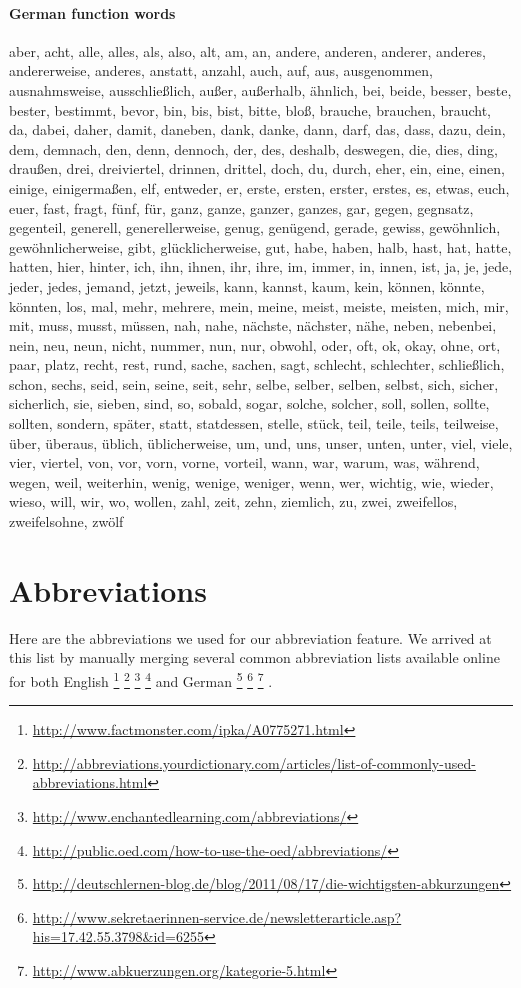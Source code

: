 \paragraph{German function words}
aber, acht, alle, alles, als, also, alt, am, an, andere, anderen, anderer, anderes, andererweise, anderes, anstatt, anzahl, auch, auf, aus, ausgenommen, ausnahmsweise, ausschließlich, außer, außerhalb, ähnlich, bei, beide, besser, beste, bester, bestimmt, bevor, bin, bis, bist, bitte, bloß, brauche, brauchen, braucht, da, dabei, daher, damit, daneben, dank, danke, dann, darf, das, dass, dazu, dein, dem, demnach, den, denn, dennoch, der, des, deshalb, deswegen, die, dies, ding, draußen, drei, dreiviertel, drinnen, drittel, doch, du, durch, eher, ein, eine, einen, einige, einigermaßen, elf, entweder, er, erste, ersten, erster, erstes, es, etwas, euch, euer, fast, fragt, fünf, für, ganz, ganze, ganzer, ganzes, gar, gegen, gegnsatz, gegenteil, generell, generellerweise, genug, genügend, gerade, gewiss, gewöhnlich, gewöhnlicherweise, gibt, glücklicherweise, gut, habe, haben, halb, hast, hat, hatte, hatten, hier, hinter, ich, ihn, ihnen, ihr, ihre, im, immer, in, innen, ist, ja, je, jede, jeder, jedes, jemand, jetzt, jeweils, kann, kannst, kaum, kein, können, könnte, könnten, los, mal, mehr, mehrere, mein, meine, meist, meiste, meisten, mich, mir, mit, muss, musst, müssen, nah, nahe, nächste, nächster, nähe, neben, nebenbei, nein, neu, neun, nicht, nummer, nun, nur, obwohl, oder, oft, ok, okay, ohne, ort, paar, platz, recht, rest, rund, sache, sachen, sagt, schlecht, schlechter, schließlich, schon, sechs, seid, sein, seine, seit, sehr, selbe, selber, selben, selbst, sich, sicher, sicherlich, sie, sieben, sind, so, sobald, sogar, solche, solcher, soll, sollen, sollte, sollten, sondern, später, statt, statdessen, stelle, stück, teil, teile, teils, teilweise, über, überaus, üblich, üblicherweise, um, und, uns, unser, unten, unter, viel, viele, vier, viertel, von, vor, vorn, vorne, vorteil, wann, war, warum, was, während, wegen, weil, weiterhin, wenig, wenige, weniger, wenn, wer, wichtig, wie, wieder, wieso, will, wir, wo, wollen, zahl, zeit, zehn, ziemlich, zu, zwei, zweifellos, zweifelsohne, zwölf


\section{Abbreviations}
\label{sec:app_abbreviations}
Here are the abbreviations we used for our abbreviation feature. We arrived at this list by manually merging several common abbreviation lists available online for both English
\footnote{\url{http://www.factmonster.com/ipka/A0775271.html}}
\footnote{\url{http://abbreviations.yourdictionary.com/articles/list-of-commonly-used-abbreviations.html}}
\footnote{\url{http://www.enchantedlearning.com/abbreviations/}}
\footnote{\url{http://public.oed.com/how-to-use-the-oed/abbreviations/}}
and German
\footnote{\url{http://deutschlernen-blog.de/blog/2011/08/17/die-wichtigsten-abkurzungen}}
\footnote{\url{http://www.sekretaerinnen-service.de/newsletterarticle.asp?his=17.42.55.3798&id=6255}}
\footnote{\url{http://www.abkuerzungen.org/kategorie-5.html}}
.



